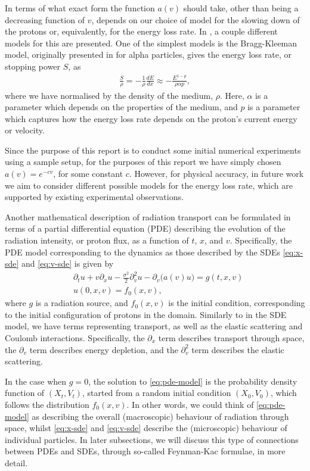 In terms of what exact form the function $a(v)$ should take, other than being a decreasing function of $v$, depends on our choice of model for the slowing down of the protons or, equivalently, for the energy loss rate. In \cite{newhauser2015physics}, a couple different models for this are presented. One of the simplest models is the Bragg-Kleeman model, originally presented in \cite{bragg_kleeman1905} for alpha particles, gives the energy loss rate, or stopping power $S$, as
%
\begin{align} 
    \frac{S}{\rho} = -\frac{1}{\rho} \frac{dE}{dx} \approx - \frac{E^{1-p}}{\rho \alpha p},
\end{align}
% 
where we have normalised by the density of the medium, $\rho$. Here, $\alpha$ is a parameter which depends on the properties of the medium, and $p$ is a parameter which captures how the energy loss rate depends on the proton's current energy or velocity.

Since the purpose of this report is to conduct some initial numerical experiments using a sample setup, for the purposes of this report we have simply chosen $a(v) = e^{-cv}$, for some constant $c$. However, for physical accuracy, in future work we aim to consider different possible models for the energy loss rate, which are supported by existing experimental observations. 

Another mathematical description of radiation transport can be formulated in terms of a partial differential equation (PDE) describing the evolution of the radiation intensity, or proton flux, as a function of $t$, $x$, and $v$. Specifically, the PDE model corresponding to the dynamics as those described by the SDEs \autoref{eq:x-sde} and \autoref{eq:v-sde} is given by 
%
\begin{align}
    \label{eq:pde-model}
    &\partial_t u + v \partial_x u - \frac{\sigma^2}{2} \partial_v^2 u - \partial_v \big( a(v) u\big) = g(t,x,v)\\
    &u(0,x,v)=f_0(x,v),
\end{align}
%
where $g$ is a radiation source, and $f_0(x,v)$ is the initial condition, corresponding to the initial configuration of protons in the domain. Similarly to in the SDE model, we have terms representing transport, as well as the elastic scattering and Coulomb interactions. Specifically, the $\partial_x$ term describes transport through space, the $\partial_v$ term describes energy depletion, and the $\partial_v^2$ term describes the elastic scattering.

In the case when $g=0$, the solution to \autoref{eq:pde-model} is the probability density function of $(X_t,V_t)$, started from a random initial condition $(X_0,V_0)$, which follows the distribution $f_0(x,v)$. In other words, we could think of \autoref{eq:pde-model} as describing the overall (macroscopic) behaviour of radiation through space, whilst \autoref{eq:x-sde} and \autoref{eq:v-sde} describe the (microscopic) behaviour of individual particles. In later subsections, we will discuss this type of connections between PDEs and SDEs, through so-called Feynman-Kac formulae, in more detail.

